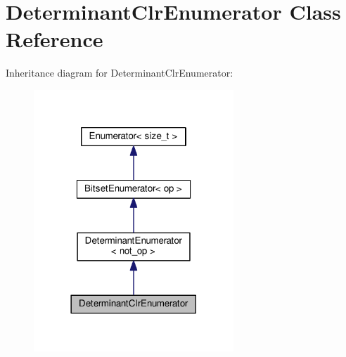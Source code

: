 \hypertarget{classDeterminantClrEnumerator}{}\section{Determinant\+Clr\+Enumerator Class Reference}
\label{classDeterminantClrEnumerator}


Inheritance diagram for Determinant\+Clr\+Enumerator\+:
\nopagebreak
\begin{figure}[H]
\begin{center}
\leavevmode
\includegraphics[width=213pt]{classDeterminantClrEnumerator__inherit__graph}
\end{center}
\end{figure}


